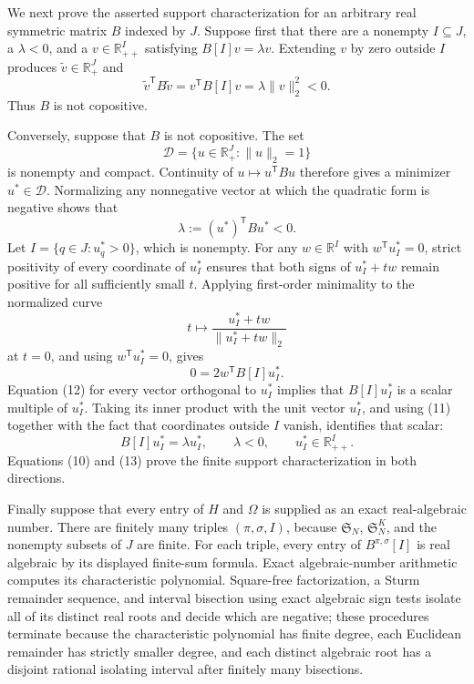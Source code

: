 We next prove the asserted support characterization for an arbitrary real symmetric matrix \(B\) indexed by \(J\).  Suppose first that there are a nonempty \(I\subseteq J\), a \(\lambda<0\), and a \(v\in\mathbb R_{++}^I\) satisfying \(B[I]v=\lambda v\).  Extending \(v\) by zero outside \(I\) produces \(\widetilde v\in\mathbb R_+^J\) and
\[
 \widetilde v^{\mathsf T}B\widetilde v
 =v^{\mathsf T}B[I]v
 =\lambda\lVert v\rVert_2^2<0. \tag{10}
\]
Thus \(B\) is not copositive.

Conversely, suppose that \(B\) is not copositive.  The set
\[
 \mathcal D=\{u\in\mathbb R_+^J:\lVert u\rVert_2=1\}
\]
is nonempty and compact.  Continuity of \(u\mapsto u^{\mathsf T}Bu\) therefore gives a minimizer \(u^*\in\mathcal D\).  Normalizing any nonnegative vector at which the quadratic form is negative shows that
\[
 \lambda:=(u^*)^{\mathsf T}Bu^*<0. \tag{11}
\]
Let \(I=\{q\in J:u_q^*>0\}\), which is nonempty.  For any \(w\in\mathbb R^I\) with \(w^{\mathsf T}u_I^*=0\), strict positivity of every coordinate of \(u_I^*\) ensures that both signs of \(u_I^*+tw\) remain positive for all sufficiently small \(t\).  Applying first-order minimality to the normalized curve
\[
 t\longmapsto\frac{u_I^*+tw}{\lVert u_I^*+tw\rVert_2}
\]
at \(t=0\), and using \(w^{\mathsf T}u_I^*=0\), gives
\[
 0=2w^{\mathsf T}B[I]u_I^*. \tag{12}
\]
Equation (12) for every vector orthogonal to \(u_I^*\) implies that \(B[I]u_I^*\) is a scalar multiple of \(u_I^*\).  Taking its inner product with the unit vector \(u_I^*\), and using (11) together with the fact that coordinates outside \(I\) vanish, identifies that scalar:
\[
 B[I]u_I^*=\lambda u_I^*,
 \qquad \lambda<0,
 \qquad u_I^*\in\mathbb R_{++}^I. \tag{13}
\]
Equations (10) and (13) prove the finite support characterization in both directions.

Finally suppose that every entry of \(H\) and \(\Omega\) is supplied as an exact real-algebraic number.  There are finitely many triples \((\pi,\sigma,I)\), because \(\mathfrak S_N\), \(\mathfrak S_N^K\), and the nonempty subsets of \(J\) are finite.  For each triple, every entry of \(B^{\pi,\sigma}[I]\) is real algebraic by its displayed finite-sum formula.  Exact algebraic-number arithmetic computes its characteristic polynomial.  Square-free factorization, a Sturm remainder sequence, and interval bisection using exact algebraic sign tests isolate all of its distinct real roots and decide which are negative; these procedures terminate because the characteristic polynomial has finite degree, each Euclidean remainder has strictly smaller degree, and each distinct algebraic root has a disjoint rational isolating interval after finitely many bisections.

